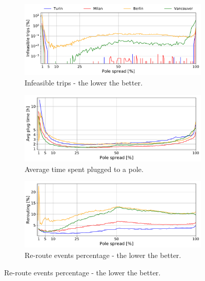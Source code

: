 \begin{figure}[t!]
    \begin{center}
        \begin{subfigure}{0.49\textwidth}
            \includegraphics[width=\columnwidth]{figures/50_Deaths_vsZones_ACS}
            \caption{Infeasible trips - the lower the better.}
            \label{fig:zoneACS_vs_IT}
        \end{subfigure}
                  \begin{subfigure}{0.49\textwidth}
            \includegraphics[width=\columnwidth]{figures/50_AvgTimeInStation_vsZones_ACS.pdf}
             \caption{Average time spent plugged to a pole.}
             \label{fig:zoneACS_vs_plug}
         \end{subfigure}        
           \begin{subfigure}{0.49\textwidth}
            \includegraphics[width=\columnwidth]{figures/50_ReroutePerc_vsZones_ACS}
             \caption{Re-route events percentage - the lower the better.}

\end{subfigure}
\end{center}
\end{figure}
